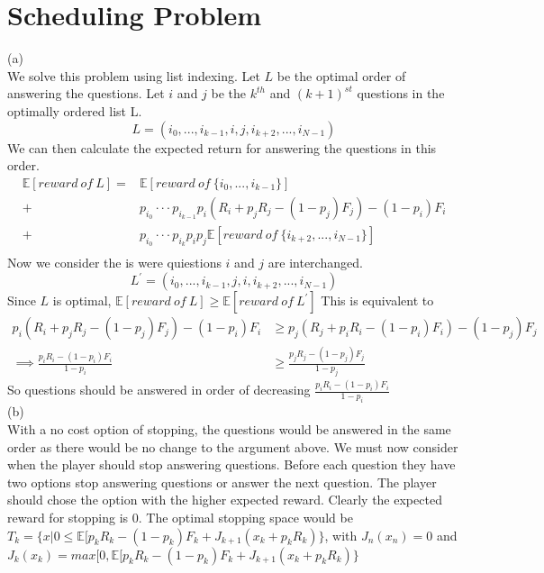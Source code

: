 \documentclass[11pt, oneside]{article}   	%
\begin{document}
\section{Scheduling Problem}
(a) \\
We solve this problem using list indexing. Let $L$ be the optimal order of answering the questions. Let $i$ and $j$ be the $k^{th}$ and $(k + 1)^{st}$ questions in the optimally ordered list L.
$$
L = (i_{0},...,i_{k-1},i,j,i_{k+2},...,i_{N-1})
$$
We can then calculate the expected return for answering the questions in this order.
\begin{align*}
\mathbb{E}[{reward~of~L}] = & \mathbb{E} [reward~of~\{i_{0},...,i_{k-1}\}] \\
+ & p_{i_{0}}···p_{i_{k-1}} p_{i}(R_{i}+p_{j}R_{j} -(1-p_{j})F_{j})-(1-p_{i})F_{i}  \\
+ & p_{i_{0}} ···p_{i_{k}} p_{i}p_{j} \mathbb{E}[reward~of~\{i_{k+2},...,i_{N-1}\}] \\
\end{align*}
Now we consider the is were quiestions $i$ and $j$ are interchanged.
$$
L^{\prime} = (i_{0},...,i_{k-1},j,i,i_{k+2},...,i_{N-1})
$$
Since $L$ is optimal, $\mathbb{E}[{reward~of~L}] \geq \mathbb{E}[{reward~of~L^{\prime}}]$
This is equivalent to 
\begin{align*}
p_{i}(R_{i}+p_{j}R_{j} -(1-p_{j})F_{j})-(1-p_{i})F_{i} &\geq p_{j}(R_{j}+p_{i}R_{i} -(1-p_{i})F_{i})-(1-p_{j})F_{j} \\
\implies \frac{p_{i}R_{i}-(1-p_{i})F_{i}}{1-p_{i}} &\geq \frac{p_{j}R_{j}-(1-p_{j})F_{j}}{1-p_{j}}
\end{align*}
So questions should be answered in order of decreasing $\frac{p_{i}R_{i}-(1-p_{i})F_{i}}{1-p_{i}}$ \\
(b) \\
With a no cost option of stopping, the questions would be answered in the same order as there would be no change to the argument above. We must now consider when the player should stop answering questions. Before each question they have two options stop answering questions or answer the next question. The player should chose the option with the higher expected reward. Clearly the expected reward for stopping is 0. The optimal stopping space would be $T_{k}=\{x|0 \leq  \mathbb{E}[p_{k}R_{k}-(1-p_{k})F_{k} + J_{k+1}(x_{k}+p_{k}R_{k} ) \}$, with $J_{n}(x_{n})=0$ and $J_{k}(x_{k}) = max[0, \mathbb{E}[p_{k}R_{k}-(1-p_{k})F_{k} + J_{k+1}(x_{k}+p_{k}R_{k} ) \}$
\end{document}
